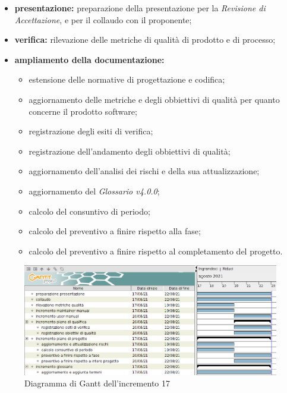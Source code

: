 \begin{itemize}
    \item \textbf{presentazione:} preparazione della presentazione per la \textit{Revisione di Accettazione}, e per il collaudo con il proponente;
    \item \textbf{verifica:} rilevazione delle metriche di qualità di prodotto e di processo;
    \item \textbf{ampliamento della documentazione:}
          \begin{itemize}
              \item estensione delle normative di progettazione e codifica;
              \item aggiornamento delle metriche e degli obbiettivi di qualità per quanto concerne il prodotto software;
              \item registrazione degli esiti di verifica;
              \item registrazione dell'andamento degli obbiettivi di qualità;
              \item aggiornamento dell'analisi dei rischi e della sua attualizzazione;
              \item aggiornamento del \textit{Glossario v4.0.0};
              \item calcolo del consuntivo di periodo;
              \item calcolo del preventivo a finire rispetto alla fase;
              \item calcolo del preventivo a finire rispetto al completamento del progetto.
          \end{itemize}
\end{itemize}

\begin{figure}[!ht]
    \caption{Diagramma di Gantt dell'incremento 17}
    \vspace{5px}
    \includegraphics[scale=0.3]{../../../Images/Diagrammi/Gantt/incremento17.png}
    \centering
\end{figure}

